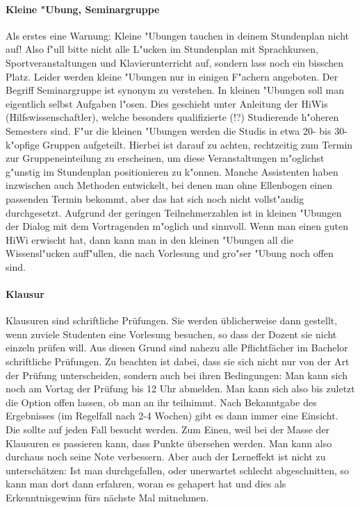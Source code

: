 \paragraph*{Kleine "Ubung, Seminargruppe}

Als erstes eine Warnung: Kleine "Ubungen tauchen in deinem Stundenplan nicht auf!
Also f"ull bitte nicht alle L"ucken im
Stundenplan mit Sprachkursen, Sportveranstaltungen und Klavierunterricht auf,
sondern lass noch ein bisschen Platz. Leider werden kleine "Ubungen nur in
einigen F"achern angeboten. Der Begriff Seminargruppe ist synonym zu verstehen.
In kleinen "Ubungen soll man eigentlich selbst Aufgaben l"osen. Dies geschieht
unter Anleitung der HiWis (Hilfswissenschaftler), welche besonders qualifizierte
(!?) Studierende h"oheren Semesters sind. F"ur die kleinen "Ubungen werden die
Studis in etwa 20- bis 30-k"opfige Gruppen aufgeteilt. Hierbei ist darauf zu
achten, rechtzeitig zum Termin zur Gruppeneinteilung zu erscheinen, um diese
Veranstaltungen m"oglichst g"unstig im Stundenplan positionieren zu k"onnen.
Manche Assistenten haben inzwischen auch Methoden entwickelt, bei denen man
ohne Ellenbogen einen passenden Termin bekommt, aber das hat sich noch nicht
vollst"andig durchgesetzt. Aufgrund der geringen Teilnehmerzahlen ist in
kleinen "Ubungen der Dialog mit dem Vortragenden m"oglich und sinnvoll. Wenn
man einen guten HiWi erwischt hat, dann kann man in den kleinen "Ubungen all
die Wissensl"ucken auff"ullen, die nach Vorlesung und gro"ser "Ubung noch offen
sind.
\paragraph*{Klausur}
Klausuren sind schriftliche Prüfungen. Sie werden üblicherweise dann
gestellt, wenn zuviele Studenten eine Vorlesung besuchen, so dass der
Dozent sie nicht einzeln prüfen will. Aus diesen Grund sind nahezu
alle Pflichtfächer im Bachelor schriftliche Prüfungen. Zu beachten ist
dabei, dass sie sich nicht nur von der Art der Prüfung unterscheiden,
sondern auch bei ihren Bedingungen: Man kann sich noch am Vortag der
Prüfung bis 12 Uhr abmelden. Man kann sich also bis zuletzt die Option
offen lassen, ob man an ihr teilnimmt. Nach Bekanntgabe des
Ergebnisses (im Regelfall nach 2-4 Wochen) gibt es dann immer eine
Einsicht. Die sollte auf jeden Fall besucht werden. Zum Einen, weil
bei der Masse der Klausuren es passieren kann, dass Punkte übersehen
werden. Man kann also durchaus noch seine Note verbessern. Aber auch
der Lerneffekt ist nicht zu unterschätzen: Ist man durchgefallen, oder
unerwartet schlecht abgeschnitten, so kann man dort dann erfahren,
woran es gehapert hat und dies als Erkenntnisgewinn fürs nächste Mal mitnehmen.

